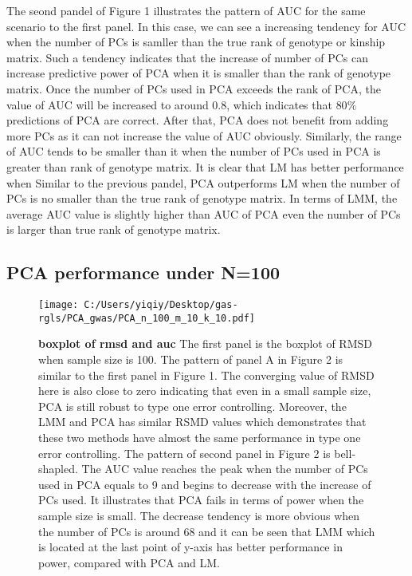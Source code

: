 \documentclass[12pt]{article}
\begin{document}
The seond pandel of Figure 1 illustrates the pattern of AUC for the same scenario to the first panel. In this case, we can see a increasing tendency for AUC when the number of PCs is samller than the true rank of genotype or kinship matrix. Such a tendency indicates that the increase of number of PCs can increase predictive power of PCA when it is smaller than the rank of genotype matrix. Once the number of PCs used in PCA exceeds the rank of PCA, the value of AUC will be increased to around 0.8, which indicates that $80\%$ predictions of PCA are correct. After that, PCA does not benefit from adding more PCs as it can not increase the value of AUC obviously. Similarly, the range of AUC tends to be smaller than it when the number of PCs used in PCA is greater than rank of genotype matrix. It is clear that LM has better performance when  Similar to the previous pandel, PCA outperforms LM when the number of PCs is no smaller than the true rank of genotype matrix. In terms of LMM, the average AUC value is slightly higher than AUC of PCA even the number of PCs is larger than true rank of genotype matrix. \\


\subsection{PCA performance under N=100}
\begin{figure}[bp!]
  \centering
  \texttt{[image: C:/Users/yiqiy/Desktop/gas-rgls/PCA\_gwas/PCA\_n\_100\_m\_10\_k\_10.pdf]}
  \caption{
    {\bf boxplot of rmsd and auc}
   The first panel is the boxplot of RMSD when sample size is 100. The pattern of panel A in Figure 2 is similar to the first panel in Figure 1. The converging value of RMSD here is also close to zero indicating that even in a small sample size, PCA is still robust to type one error controlling. Moreover, the LMM and PCA has similar RSMD values which demonstrates that these two methods have almost the same performance in type one error controlling. The pattern of second panel in Figure 2 is bell-shapled. The AUC value reaches the peak when the number of PCs used in PCA equals to 9 and begins to decrease with the increase of PCs used. It illustrates that PCA fails in terms of power when the sample size is small. The decrease tendency is more obvious when the number of PCs is around 68 and it can be seen that LMM which is located at the last point of y-axis has better performance in power, compared with PCA and LM.  }
  \label{fig:example}
\end{figure}
\end{document}
